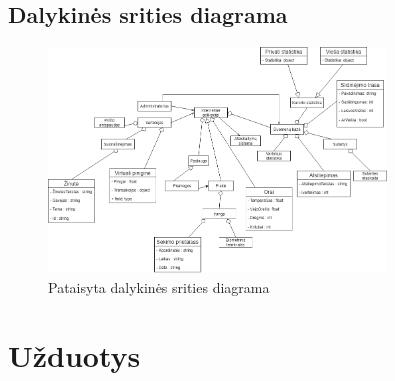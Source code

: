\documentclass[oneside]{VUMIFPSkursinis}
\begin{document}
\subsection{Dalykinės srities diagrama}
\begin{figure}[h]
    \centering
    \includegraphics[width=0.80\textwidth]{DomainModelFixed.png}
    \caption{Pataisyta dalykinės srities diagrama}
    \label{fig:dalykinesdiagrama}
\end{figure}

\section{Užduotys}
\end{document}
